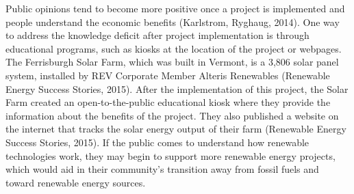     \par Public opinions tend to become more positive once a project is implemented and people understand the economic benefits (Karlstrom, Ryghaug, 2014). One way to address the knowledge deficit after project implementation is through educational programs, such as kiosks at the location of the project or webpages. The Ferrisburgh Solar Farm, which was built in Vermont, is a 3,806 solar panel system, installed by REV Corporate Member Alteris Renewables (Renewable Energy Success Stories, 2015). After the implementation of this project, the Solar Farm created an open-to-the-public educational kiosk where they provide the information about the benefits of the project. They also published a website on the internet that tracks the solar energy output of their farm (Renewable Energy Success Stories, 2015). If the public comes to understand how renewable technologies work, they may begin to support more renewable energy projects, which would aid in their community's transition away from fossil fuels and toward renewable energy sources.

